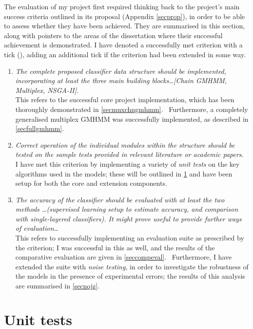 \documentclass[12pt,a4paper,twoside,openright]{report}
\begin{document}
The evaluation of my project first required thinking back to the project's main success criteria outlined in its proposal (Appendix \ref{secprop}), in order to be able to assess whether they have been achieved. They are summarised in this section, along with pointers to the areas of the dissertation where their successful achievement is demonstrated. I have denoted a successfully met criterion with a tick (\checkmark), adding an additional tick if the criterion had been extended in some way.
\begin{enumerate}[label=\bf Criterion \arabic*:]
	\item \emph{The complete proposed classifier data structure should be implemented, incorporating at least the three main building blocks\dots [Chain GMHMM, Multiplex, NSGA-II].}\\
		This refers to the successful core project implementation, which has been thoroughly demonstrated in \cref{secmuxchngmhmm}. \checkmark\ Furthermore, a completely generalised multiplex GMHMM was successfully implemented, as described in \cref{secfullgmhmm}. \checkmark
	\item \emph{Correct operation of the individual modules within the structure should be tested on the sample tests provided in relevant literature or academic papers.}\\
		I have met this criterion by implementing a variety of \emph{unit tests} on the key algorithms used in the models; these will be outlined in \cref{secunittests} and have been setup for both the core and extension components. \checkmark\checkmark
	\item \emph{The accuracy of the classifier should be evaluated with at least the two methods \dots (supervised learning setup to estimate accuracy, and comparison with single-layered classifiers). It might prove useful to provide further ways of evaluation\dots}\\
		This refers to successfully implementing an evaluation suite as prescribed by the criterion; I was successful in this as well, and the results of the comparative evaluation are given in \cref{seccompeval}. \checkmark\ Furthermore, I have extended the suite with \emph{noise testing}, in order to investigate the robustness of the models in the presence of experimental errors; the results of this analysis are summarised in \cref{secnojz}. \checkmark
\end{enumerate}

\section{Unit tests}\label{secunittests}
\end{document}
